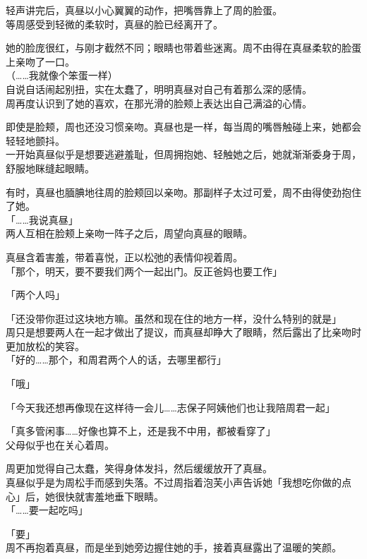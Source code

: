 轻声讲完后，真昼以小心翼翼的动作，把嘴唇靠上了周的脸蛋。\\

等周感受到轻微的柔软时，真昼的脸已经离开了。

她的脸庞很红，与刚才截然不同；眼睛也带着些迷离。周不由得在真昼柔软的脸蛋上亲吻了一口。\\

（……我就像个笨蛋一样）\\

自说自话闹起别扭，实在太蠢了，明明真昼对自己有着那么深的感情。\\

周再度认识到了她的喜欢，在那光滑的脸颊上表达出自己满溢的心情。

即使是脸颊，周也还没习惯亲吻。真昼也是一样，每当周的嘴唇触碰上来，她都会轻轻地颤抖。\\

一开始真昼似乎是想要逃避羞耻，但周拥抱她、轻触她之后，她就渐渐委身于周，舒服地眯缝起眼睛。

有时，真昼也腼腆地往周的脸颊回以亲吻。那副样子太过可爱，周不由得使劲抱住了她。\\

「……我说真昼」\\

两人互相在脸颊上亲吻一阵子之后，周望向真昼的眼睛。

真昼含着害羞，带着喜悦，正以松弛的表情仰视着周。\\

「那个，明天，要不要我们两个一起出门。反正爸妈也要工作」

「两个人吗」

「还没带你逛过这块地方嘛。虽然和现在住的地方一样，没什么特别的就是」\\

周只是想要两人在一起才做出了提议，而真昼却睁大了眼睛，然后露出了比亲吻时更加放松的笑容。\\%

「好的……那个，和周君两个人的话，去哪里都行」

「哦」

「今天我还想再像现在这样待一会儿……志保子阿姨他们也让我陪周君一起」

「真多管闲事……好像也算不上，还是我不中用，都被看穿了」\\

父母似乎也在关心着周。

周更加觉得自己太蠢，笑得身体发抖，然后缓缓放开了真昼。\\

真昼似乎是为周松手而感到失落。不过周指着泡芙小声告诉她「我想吃你做的点心」后，她很快就害羞地垂下眼睛。\\

「……要一起吃吗」

「要」\\

周不再抱着真昼，而是坐到她旁边握住她的手，接着真昼露出了温暖的笑颜。
